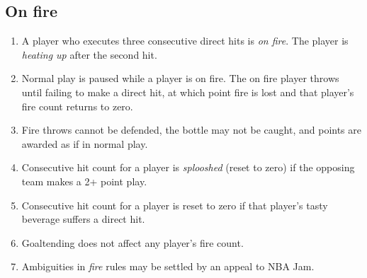 \documentclass[11pt,letterpaper,twocolumn,english,DIV=calc]{scrartcl}
\begin{document}
\subsection{On fire}
\begin{enumerate}[leftmargin=2.8em, label=\thesubsection.\arabic*]
	\item \label{enu:fire_count} A player who executes three consecutive direct hits is \emph{on fire}.
	The player is \emph{heating up} after the second hit.
	\item Normal play is paused while a player is on fire. 
	The on fire player throws until failing to make a direct hit, at which point fire is lost and that player's fire count returns to zero.
	\item Fire throws cannot be defended, the bottle may not be caught, and points are awarded as if in normal play.
	\item \label{enu:splooshing_1} Consecutive hit count for a player is \emph{splooshed} (reset to zero) if the opposing team makes a 2+ point play.
	\item Consecutive hit count for a player is reset to zero if that player's tasty beverage suffers a direct hit.
	\item Goaltending does not affect any player's fire count.
	\item Ambiguities in \emph{fire} rules may be settled by an appeal to NBA Jam.
\end{enumerate}
\end{document}
